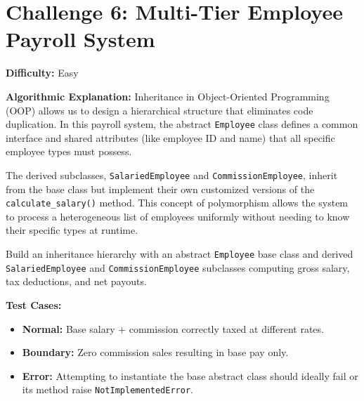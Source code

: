 \section{Challenge 6: Multi-Tier Employee Payroll System}

\textbf{Difficulty:} Easy

\textbf{Algorithmic Explanation:}
Inheritance in Object-Oriented Programming (OOP) allows us to design a hierarchical structure that eliminates code duplication. In this payroll system, the abstract \texttt{Employee} class defines a common interface and shared attributes (like employee ID and name) that all specific employee types must possess.

The derived subclasses, \texttt{SalariedEmployee} and \texttt{CommissionEmployee}, inherit from the base class but implement their own customized versions of the \texttt{calculate\_salary()} method. This concept of polymorphism allows the system to process a heterogeneous list of employees uniformly without needing to know their specific types at runtime.

\begin{practiceset}
Build an inheritance hierarchy with an abstract \texttt{Employee} base class and derived \texttt{SalariedEmployee} and \texttt{CommissionEmployee} subclasses computing gross salary, tax deductions, and net payouts.

\textbf{Test Cases:}
\begin{itemize}
    \item \textbf{Normal:} Base salary + commission correctly taxed at different rates.
    \item \textbf{Boundary:} Zero commission sales resulting in base pay only.
    \item \textbf{Error:} Attempting to instantiate the base abstract class should ideally fail or its method raise \texttt{NotImplementedError}.
\end{itemize}
\end{practiceset}

